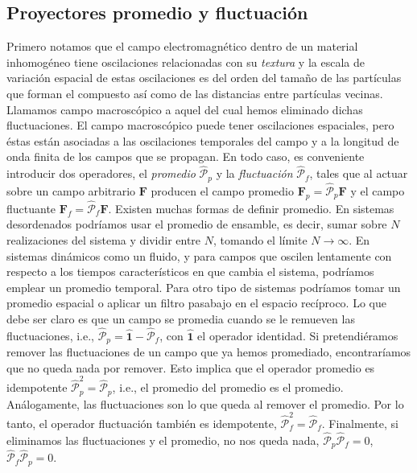 \documentclass[12pt]{article}
\begin{document}
\subsection{Proyectores promedio y fluctuación}
Primero notamos que el campo electromagnético dentro de un material inhomogéneo
tiene oscilaciones relacionadas con su {\em textura}  y la
escala de variación espacial de estas oscilaciones es del orden del
tamaño de las partículas que forman el compuesto así como de las
distancias entre partículas vecinas.  Llamamos campo macroscópico a
aquel del cual hemos eliminado dichas fluctuaciones. El campo
macroscópico puede tener oscilaciones espaciales, pero éstas están
asociadas a las oscilaciones temporales del campo y a la longitud de
onda finita de los campos que se propagan. En todo caso, es
conveniente introducir dos operadores, el {\em promedio}
$\hat {\mathcal P}_p$ y la {\em fluctuación} $\hat {\mathcal P}_f$,
tales que al actuar sobre un campo arbitrario $\bm F$ producen el
campo promedio $\bm F_p=\hat {\mathcal P}_p \bm F$ y el campo
fluctuante $\bm F_f=\hat {\mathcal P}_f \bm F$. Existen muchas formas
de definir promedio. En sistemas desordenados podríamos usar el
promedio de ensamble, es decir, sumar sobre $N$ realizaciones del
sistema y dividir entre $N$, tomando el límite $N\to\infty$. En
sistemas dinámicos como un fluido, y para campos que oscilen
lentamente con respecto a los tiempos característicos en que cambia el
sistema, podríamos emplear un promedio temporal. Para otro tipo de
sistemas podríamos tomar un promedio espacial o aplicar un filtro
pasabajo en el espacio recíproco. Lo que debe ser claro es que un
campo se promedia cuando se le remueven las fluctuaciones, i.e.,
$\hat{\mathcal P}_p=\hat {\bm 1}-\hat{\mathcal P}_f$, con
$\hat {\bm 1}$ el operador identidad. Si pretendiéramos remover las
fluctuaciones de un campo que ya hemos promediado, encontraríamos
que no queda nada por remover. Esto implica que el operador promedio
es idempotente $\hat{\mathcal P}_p^2=\hat{\mathcal P}_p$, i.e., el
promedio del promedio es el promedio. Análogamente, las fluctuaciones
son lo que queda al remover el promedio. Por lo tanto, el operador
fluctuación también es idempotente,
$\hat{\mathcal P}_f^2=\hat{\mathcal P}_f$. Finalmente, si eliminamos las
fluctuaciones y el promedio, no nos queda nada,
$\hat{\mathcal P}_p\hat{\mathcal P}_f=0$,
$\hat{\mathcal P}_f\hat{\mathcal P}_p=0$.
\end{document}
